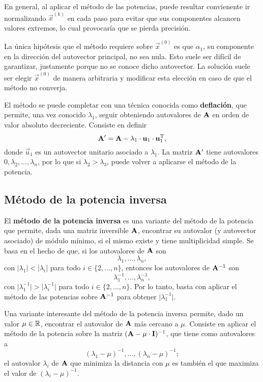 En general, al aplicar el método de las potencias, puede resultar convienente
ir normalizando $\vec{x}^{(k)}$ en cada paso para evitar que sus componentes
alcancen valores extremos, lo cual provocaría que se pierda precisión.

La única hipótesis que el método requiere sobre $\vec{x}^{(0)}$ es que
$\alpha_1$, su componente en la dirección del autovector principal, no sea
nula. Esto suele ser difícil de garantizar, justamente porque no se conoce
dicho autovector. La solución suele ser elegir $\vec{x}^{(0)}$ de manera
arbitraria y modificar esta elección en caso de que el método no converja.

El método se puede completar con una técnica conocida como \textbf{deflación},
que permite, una vez conocido $\lambda_1$, seguir obteniendo autovalores de
$\mathbf{A}$ en orden de valor absoluto decreciente. Consiste en definir
\[\mathbf{A'} = \mathbf{A} - \lambda_1 \cdot \mathbf{u}_1 \cdot \mathbf{u}_1^{\mathrm{T}}, \]
donde $\vec{u}_1$ es un autovector unitario asociado a $\lambda_1$.
La matriz $\mathbf{A'}$ tiene autovalores $0, \lambda_2, \dots, \lambda_n$,
por lo que si $\lambda_2 > \lambda_3$, puede volver a aplicarse el método de
la potencia.

\subsection{Método de la potencia inversa}
El \textbf{método de la potencia inversa} es una variante del método de la
potencia que permite, dada una matriz inversible $\mathbf{A}$, encontrar su
autovalor (y autovector asociado) de módulo mínimo, si el mismo existe y
tiene multiplicidad simple.
Se basa en el hecho de que, si los autovalores de $\mathbf{A}$ son 
\[ \lambda_1, \dots, \lambda_n, \]
con $\lvert \lambda_1 \rvert < \lvert \lambda_i \rvert$ para todo $i \in
\{2,\dots,n\}$, entonces los autovalores de $\mathbf{A}^{-1}$ son
\[ \lambda_1^{-1}, \dots, \lambda_n^{-1}, \]
con $\lvert \lambda_1^{-1} \rvert > \lvert \lambda_i^{-1} \rvert$
para todo $i \in \{2,\dots,n\}$.
Por lo tanto, basta con aplicar el método de las potencias sobre
$\mathbf{A}^{-1}$ para obtener $\lvert \lambda_1^{-1} \rvert$.

Una variante interesante del método de la potencia inversa permite, dado un
valor $\mu \in \mathbb{R}$, encontrar el autovalor de $\mathbf{A}$ más cercano a
$\mu$. Consiste en aplicar el método de la potencia sobre la matriz $(\mathbf{A}
- \mu \cdot \mathbf{I})^{-1}$, que tiene como autovalores a
\[ (\lambda_1 - \mu)^{-1}, \dots, (\lambda_n - \mu)^{-1}; \]
el autovalor $\lambda_i$ de $\mathbf{A}$ que minimiza la distancia con $\mu$ es
también el que maximiza el valor de $(\lambda_i - \mu)^{-1}$.

